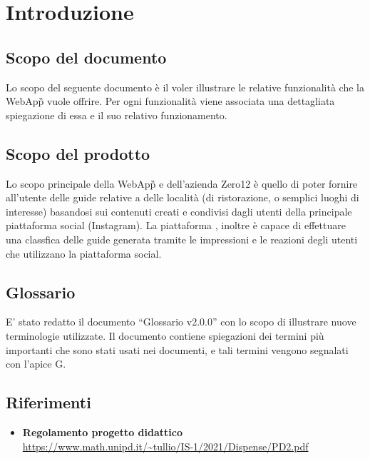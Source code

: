 \section{Introduzione}

\subsection{Scopo del documento}
Lo scopo del seguente documento è il voler illustrare
le relative funzionalità che la WebApp\G{} \platform{} vuole offrire.
Per ogni funzionalità viene associata una dettagliata spiegazione di essa e
il suo relativo funzionamento.

\subsection{Scopo del prodotto}
Lo scopo principale della WebApp\G{} \platform{} e dell'azienda Zero12 è quello di poter fornire all'utente delle guide
relative a delle località (di ristorazione, o semplici luoghi di interesse) basandosi sui contenuti creati e condivisi dagli utenti
della principale piattaforma social (Instagram). 
La piattaforma \platform, inoltre è capace di effettuare una classfica delle guide generata tramite le impressioni e le reazioni degli utenti 
che utilizzano la piattaforma social.

\subsection{Glossario}
E' stato redatto il documento ``Glossario v2.0.0'' con lo scopo di illustrare nuove terminologie utilizzate.
Il documento contiene spiegazioni dei termini più importanti che sono stati usati nei documenti, e tali termini
vengono segnalati con l'apice G.

\subsection{Riferimenti}
\begin{itemize}
	\item
	{\textbf{Regolamento progetto didattico}}\\\url{https://www.math.unipd.it/~tullio/IS-1/2021/Dispense/PD2.pdf}

\end{itemize}
